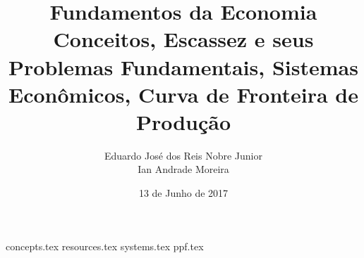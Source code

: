 \usepackage[utf8]{inputenc}
\usepackage{import}
\usepackage{natbib}
\usepackage{graphicx}
\usepackage{verbatim}

\usepackage[T1]{fontenc}
\usepackage[portuguese]{babel}
\usepackage{hyphenat}


\newenvironment{nscenter}
 {\parskip=0pt\par\nopagebreak\centering}
 {\par\noindent\ignorespacesafterend}


\title{Fundamentos da Economia \\ \normalsize Conceitos, Escassez e seus Problemas Fundamentais, Sistemas Econômicos, Curva de Fronteira de Produção\vspace{30ex}}
\author{Eduardo José dos Reis Nobre Junior\\Ian Andrade Moreira\vspace{30ex}}
\date{13 de Junho de 2017}
\maketitle
\clearpage

{concepts.tex}
{resources.tex}
{systems.tex}
{ppf.tex}



